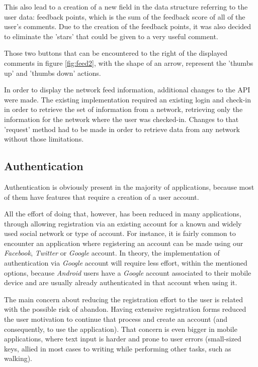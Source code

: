 This also lead to a creation of a new field in the data structure referring to the user data: feedback points, which is the sum of the feedback score of all of the user's comments. Due to the creation of the feedback points, it was also decided to eliminate the 'stars' that could be given to a very useful comment.

Those two buttons that can be encountered to the right of the displayed comments in figure \ref{fig:feed2}, with the shape of an arrow, represent the 'thumbs up' and 'thumbs down' actions.

In order to display the network feed information, additional changes to the API were made. The existing implementation required an existing login and check-in in order to retrieve the set of information from a network, retrieving only the information for the network where the user was checked-in. Changes to that 'request' method had to be made in order to retrieve data from any network without those limitations.

\subsection{Authentication}\label{authentication}

Authentication is obviously present in the majority of applications, because most of them have features that require a creation of a user account.

All the effort of doing that, however, has been reduced in many applications, through allowing registration via an existing account for a known and widely used social network or type of account. For instance, it is fairly common to encounter an application where registering an account can be made using our \emph{Facebook}, \emph{Twitter} or \emph{Google} account. In theory, the implementation of authentication via \emph{Google} account will require less effort, within the mentioned options, because \emph{Android} users have a \emph{Google} account associated to their mobile device and are usually already authenticated in that account when using it.

The main concern about reducing the registration effort to the user is related with the possible risk of abandon. Having extensive registration forms reduced the user motivation to continue that process and create an account (and consequently, to use the application). That concern is even bigger in mobile applications, where text input is harder and prone to user errors (small-sized keys, allied in most cases to writing while performing other tasks, such as walking).

